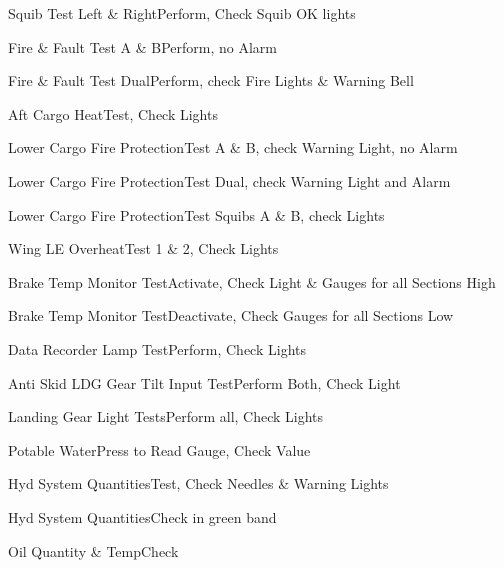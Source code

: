 \documentclass[sim-use]{checklist}
\begin{document}
\begin{continuedchecklist}
	 {
		\item{Squib Test Left \& Right}{Perform, Check Squib OK lights}
		\item{Fire \& Fault Test A \& B}{Perform, no Alarm}
		\item{Fire \& Fault Test Dual}{Perform, check Fire Lights \& Warning Bell}
		\item{Aft Cargo Heat}{Test, Check Lights}
		\item{Lower Cargo Fire Protection}{Test A \& B, check Warning Light, no Alarm}
		\item{Lower Cargo Fire Protection}{Test Dual, check Warning Light and Alarm}
		\item{Lower Cargo Fire Protection}{Test Squibs A \& B, check Lights}
		\item{Wing LE Overheat}{Test 1 \& 2, Check Lights}
	}
	 {
		\item{Brake Temp Monitor Test}{Activate, Check Light \& Gauges for all Sections High}
		\item{Brake Temp Monitor Test}{Deactivate, Check Gauges for all Sections Low}
		\item{Data Recorder Lamp Test}{Perform, Check Lights}
		\item{Anti Skid LDG Gear Tilt Input Test}{Perform Both, Check Light}
		\item{Landing Gear Light Tests}{Perform all, Check Lights}
		\item{Potable Water}{Press to Read Gauge, Check Value}
		\item{Hyd System Quantities}{Test, Check Needles \& Warning Lights}
		\item{Hyd System Quantities}{Check in green band}
	}
	\item{Oil Quantity \& Temp}{Check}
\end{continuedchecklist}
\end{document}
